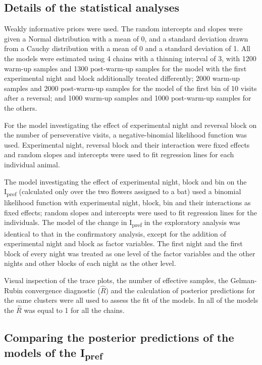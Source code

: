 \documentclass[
]{article}
\begin{document}
\hypertarget{details-of-the-statistical-analyses}{%
\subsection{Details of the statistical analyses}\label{details-of-the-statistical-analyses}}

Weakly informative priors were used. The random intercepts and slopes were given a Normal distribution with a mean of 0, and a standard deviation drawn from a Cauchy distribution with a mean of 0 and a standard deviation of 1. All the models were estimated using 4 chains with a thinning interval of 3, with 1200 warm-up samples and 1300 post-warm-up samples for the model with the first experimental night and block additionally treated differently; 2000 warm-up samples and 2000 post-warm-up samples for the model of the first bin of 10 visits after a reversal; and 1000 warm-up samples and 1000 post-warm-up samples for the others.

For the model investigating the effect of experimental night and reversal block on the number of perseverative visits, a negative-binomial likelihood function was used. Experimental night, reversal block and their interaction were fixed effects and random slopes and intercepts were used to fit regression lines for each individual animal.

The model investigating the effect of experimental night, block and bin on the I\textsubscript{pref} (calculated only over the two flowers assigned to a bat) used a binomial likelihood function with experimental night, block, bin and their interactions as fixed effects; random slopes and intercepts were used to fit regression lines for the individuals. The model of the change in I\textsubscript{pref} in the exploratory analysis was identical to that in the confirmatory analysis, except for the addition of experimental night and block as factor variables. The first night and the first block of every night was treated as one level of the factor variables and the other nights and other blocks of each night as the other level.

Visual inspection of the trace plots, the number of effective samples, the Gelman-Rubin convergence diagnostic (\(\hat R\)) and the calculation of posterior predictions for the same clusters were all used to assess the fit of the models. In all of the models the \(\hat R\) was equal to 1 for all the chains.

\hypertarget{comparing-the-posterior-predictions-of-the-models-of-the-ipref}{%
\subsection{\texorpdfstring{Comparing the posterior predictions of the models of the I\textsubscript{pref}}{Comparing the posterior predictions of the models of the Ipref}}\label{comparing-the-posterior-predictions-of-the-models-of-the-ipref}}
\end{document}
